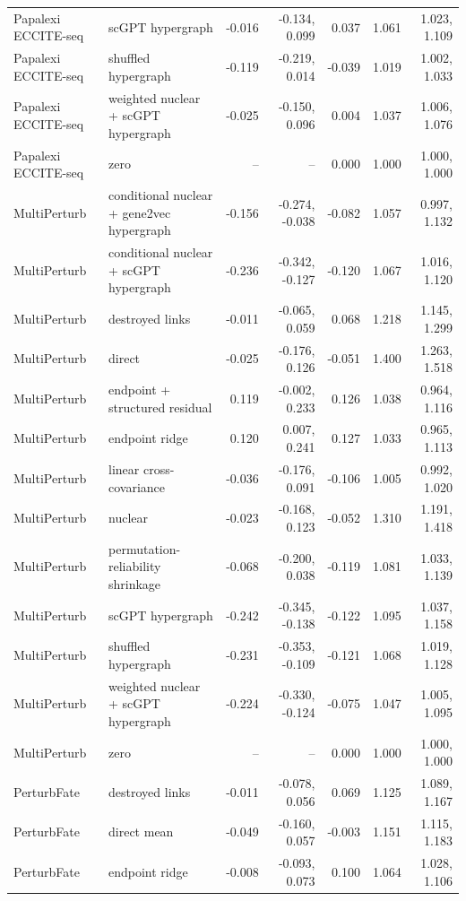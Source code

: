 \begin{longtable}{@{}p{2.5cm}p{5.0cm}rrrrr@{}}
Papalexi ECCITE-seq & scGPT hypergraph & -0.016 & -0.134, 0.099 & 0.037 & 1.061 & 1.023, 1.109 \\
Papalexi ECCITE-seq & shuffled hypergraph & -0.119 & -0.219, 0.014 & -0.039 & 1.019 & 1.002, 1.033 \\
Papalexi ECCITE-seq & weighted nuclear + scGPT hypergraph & -0.025 & -0.150, 0.096 & 0.004 & 1.037 & 1.006, 1.076 \\
Papalexi ECCITE-seq & zero & -- & -- & 0.000 & 1.000 & 1.000, 1.000 \\
MultiPerturb & conditional nuclear + gene2vec hypergraph & -0.156 & -0.274, -0.038 & -0.082 & 1.057 & 0.997, 1.132 \\
MultiPerturb & conditional nuclear + scGPT hypergraph & -0.236 & -0.342, -0.127 & -0.120 & 1.067 & 1.016, 1.120 \\
MultiPerturb & destroyed links & -0.011 & -0.065, 0.059 & 0.068 & 1.218 & 1.145, 1.299 \\
MultiPerturb & direct & -0.025 & -0.176, 0.126 & -0.051 & 1.400 & 1.263, 1.518 \\
MultiPerturb & endpoint + structured residual & 0.119 & -0.002, 0.233 & 0.126 & 1.038 & 0.964, 1.116 \\
MultiPerturb & endpoint ridge & 0.120 & 0.007, 0.241 & 0.127 & 1.033 & 0.965, 1.113 \\
MultiPerturb & linear cross-covariance & -0.036 & -0.176, 0.091 & -0.106 & 1.005 & 0.992, 1.020 \\
MultiPerturb & nuclear & -0.023 & -0.168, 0.123 & -0.052 & 1.310 & 1.191, 1.418 \\
MultiPerturb & permutation-reliability shrinkage & -0.068 & -0.200, 0.038 & -0.119 & 1.081 & 1.033, 1.139 \\
MultiPerturb & scGPT hypergraph & -0.242 & -0.345, -0.138 & -0.122 & 1.095 & 1.037, 1.158 \\
MultiPerturb & shuffled hypergraph & -0.231 & -0.353, -0.109 & -0.121 & 1.068 & 1.019, 1.128 \\
MultiPerturb & weighted nuclear + scGPT hypergraph & -0.224 & -0.330, -0.124 & -0.075 & 1.047 & 1.005, 1.095 \\
MultiPerturb & zero & -- & -- & 0.000 & 1.000 & 1.000, 1.000 \\
PerturbFate & destroyed links & -0.011 & -0.078, 0.056 & 0.069 & 1.125 & 1.089, 1.167 \\
PerturbFate & direct mean & -0.049 & -0.160, 0.057 & -0.003 & 1.151 & 1.115, 1.183 \\
PerturbFate & endpoint ridge & -0.008 & -0.093, 0.073 & 0.100 & 1.064 & 1.028, 1.106 \\

\end{longtable}
